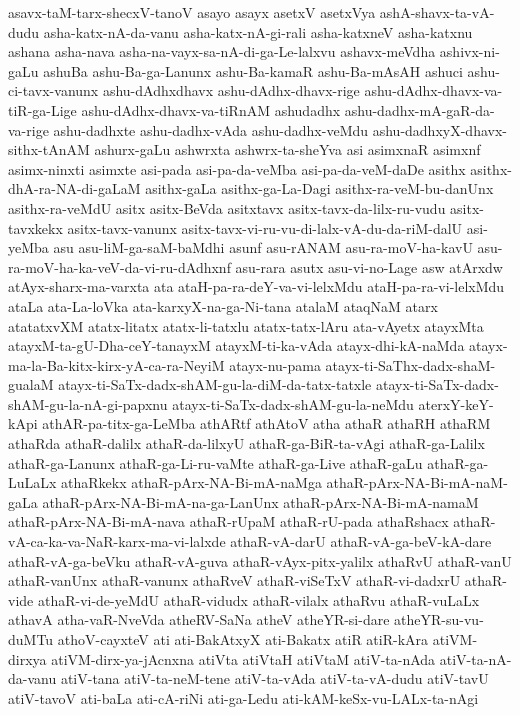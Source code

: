 {asavx-taM-tarx-shecxV-tanoV
asayo
asayx
asetxV
asetxVya
ashA-shavx-ta-vA-dudu
asha-katx-nA-da-vanu
asha-katx-nA-gi-rali
asha-katxneV
asha-katxnu
ashana
asha-nava
asha-na-vayx-sa-nA-di-ga-Le-lalxvu
ashavx-meVdha
ashivx-ni-gaLu
ashuBa
ashu-Ba-ga-Lanunx
ashu-Ba-kamaR
ashu-Ba-mAsAH
ashuci
ashu-ci-tavx-vanunx
ashu-dAdhxdhavx
ashu-dAdhx-dhavx-rige
ashu-dAdhx-dhavx-va-tiR-ga-Lige
ashu-dAdhx-dhavx-va-tiRnAM
ashudadhx
ashu-dadhx-mA-gaR-da-va-rige
ashu-dadhxte
ashu-dadhx-vAda
ashu-dadhx-veMdu
ashu-dadhxyX-dhavx-sithx-tAnAM
ashurx-gaLu
ashwrxta
ashwrx-ta-sheYva
asi
asimxnaR
asimxnf
asimx-ninxti
asimxte
asi-pada
asi-pa-da-veMba
asi-pa-da-veM-daDe
asithx
asithx-dhA-ra-NA-di-gaLaM
asithx-gaLa
asithx-ga-La-Dagi
asithx-ra-veM-bu-danUnx
asithx-ra-veMdU
asitx
asitx-BeVda
asitxtavx
asitx-tavx-da-lilx-ru-vudu
asitx-tavxkekx
asitx-tavx-vanunx
asitx-tavx-vi-ru-vu-di-lalx-vA-du-da-riM-dalU
asi-yeMba
asu
asu-liM-ga-saM-baMdhi
asunf
asu-rANAM
asu-ra-moV-ha-kavU
asu-ra-moV-ha-ka-veV-da-vi-ru-dAdhxnf
asu-rara
asutx
asu-vi-no-Lage
asw
atArxdw
atAyx-sharx-ma-varxta
ata
ataH-pa-ra-deY-va-vi-lelxMdu
ataH-pa-ra-vi-lelxMdu
ataLa
ata-La-loVka
ata-karxyX-na-ga-Ni-tana
atalaM
ataqNaM
atarx
atatatxvXM
atatx-litatx
atatx-li-tatxlu
atatx-tatx-lAru
ata-vAyetx
atayxMta
atayxM-ta-gU-Dha-ceY-tanayxM
atayxM-ti-ka-vAda
atayx-dhi-kA-naMda
atayx-ma-la-Ba-kitx-kirx-yA-ca-ra-NeyiM
atayx-nu-pama
atayx-ti-SaThx-dadx-shaM-gualaM
atayx-ti-SaTx-dadx-shAM-gu-la-diM-da-tatx-tatxle
atayx-ti-SaTx-dadx-shAM-gu-la-nA-gi-papxnu
atayx-ti-SaTx-dadx-shAM-gu-la-neMdu
aterxY-keY-kApi
athAR-pa-titx-ga-LeMba
athARtf
athAtoV
atha
athaR
athaRH
athaRM
athaRda
athaR-dalilx
athaR-da-lilxyU
athaR-ga-BiR-ta-vAgi
athaR-ga-Lalilx
athaR-ga-Lanunx
athaR-ga-Li-ru-vaMte
athaR-ga-Live
athaR-gaLu
athaR-ga-LuLaLx
athaRkekx
athaR-pArx-NA-Bi-mA-naMga
athaR-pArx-NA-Bi-mA-naM-gaLa
athaR-pArx-NA-Bi-mA-na-ga-LanUnx
athaR-pArx-NA-Bi-mA-namaM
athaR-pArx-NA-Bi-mA-nava
athaR-rUpaM
athaR-rU-pada
athaRshacx
athaR-vA-ca-ka-va-NaR-karx-ma-vi-lalxde
athaR-vA-darU
athaR-vA-ga-beV-kA-dare
athaR-vA-ga-beVku
athaR-vA-guva
athaR-vAyx-pitx-yalilx
athaRvU
athaR-vanU
athaR-vanUnx
athaR-vanunx
athaRveV
athaR-viSeTxV
athaR-vi-dadxrU
athaR-vide
athaR-vi-de-yeMdU
athaR-vidudx
athaR-vilalx
athaRvu
athaR-vuLaLx
athavA
atha-vaR-NveVda
atheRV-SaNa
atheV
atheYR-si-dare
atheYR-su-vu-duMTu
athoV-cayxteV
ati
ati-BakAtxyX
ati-Bakatx
atiR
atiR-kAra
atiVM-dirxya
atiVM-dirx-ya-jAcnxna
atiVta
atiVtaH
atiVtaM
atiV-ta-nAda
atiV-ta-nA-da-vanu
atiV-tana
atiV-ta-neM-tene
atiV-ta-vAda
atiV-ta-vA-dudu
atiV-tavU
atiV-tavoV
ati-baLa
ati-cA-riNi
ati-ga-Ledu
ati-kAM-keSx-vu-LALx-ta-nAgi
}
